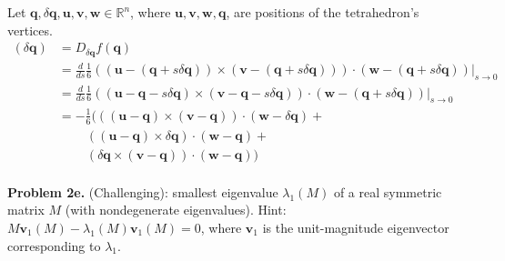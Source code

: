 \documentclass[11pt]{article}
\newcommand{\bq}{\mathbf{q}}
\newcommand{\bu}{\mathbf{u}}
\newcommand{\bv}{\mathbf{v}}
\newcommand{\bw}{\mathbf{w}}
\begin{document}
\noindent Let $\bq, \delta \bq, \bu, \bv, \bw \in \mathbb{R}^n$, where $\bu, \bv, \bw, \bq$, are positions of the tetrahedron's vertices.
\begin{align*}
[df(\bq)](\delta \bq) 
    &= D_{\delta \bq} f(\bq) \\
    &= \frac{d}{ds} \frac{1}{6} ((\bu - (\bq + s \delta \bq)) \times (\bv - (\bq + s \delta \bq))) \cdot (\bw - (\bq + s \delta \bq)) \Big|_{s \to 0} \\
    &= \frac{d}{ds} \frac{1}{6} ((\bu - \bq - s \delta \bq) \times (\bv - \bq - s \delta \bq)) \cdot (\bw - (\bq + s \delta \bq)) \Big|_{s \to 0} \\
    &= - \frac{1}{6} \big(((\bu - \bq) \times (\bv - \bq)) \cdot (\bw - \delta \bq) + \\
    & \ \ \ \ \ \ \ \ \ \ ((\bu - \bq) \times \delta \bq) \cdot (\bw - \bq) + \\
    & \ \ \ \ \ \ \ \ \ \ (\delta \bq \times (\bv - \bq)) \cdot (\bw - \bq) \big) \\ 
\end{align*}

\noindent \textbf{Problem 2e.}
(Challenging): smallest eigenvalue $\lambda_1(M)$ of a real symmetric matrix $M$ (with nondegenerate eigenvalues). Hint: $M\bv_1(M) - \lambda_1(M)\bv_1(M) = 0$, where $\bv_1$ is the unit-magnitude eigenvector corresponding to $\lambda_1$.
\end{document}
